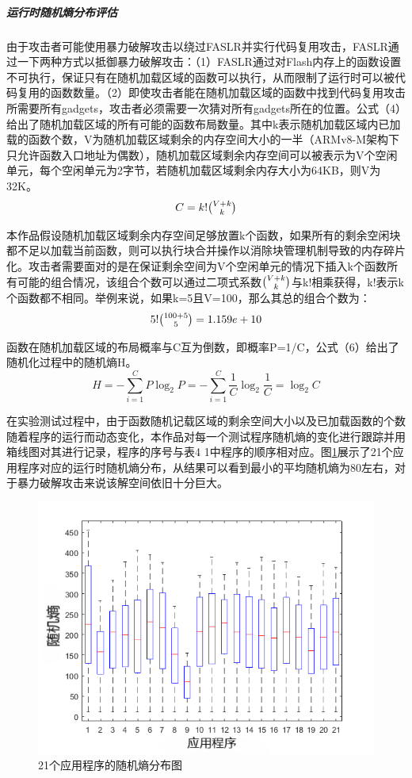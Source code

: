\documentclass[UTF8,12pt,a4paper,twoside]{ctexart}
\numberwithin{figure}{section}
\begin{document}
\subparagraph{运行时随机熵分布评估}
\par 由于攻击者可能使用暴力破解攻击以绕过FASLR并实行代码复用攻击，FASLR通过一下两种方式以抵御暴力破解攻击：（1）FASLR通过对Flash内存上的函数设置不可执行，保证只有在随机加载区域的函数可以执行，从而限制了运行时可以被代码复用的函数数量。（2）即使攻击者能在随机加载区域的函数中找到代码复用攻击所需要所有gadgets，攻击者必须需要一次猜对所有gadgets所在的位置。公式（4）给出了随机加载区域的所有可能的函数布局数量。其中k表示随机加载区域内已加载的函数个数，V为随机加载区域剩余的内存空间大小的一半（ARMv8-M架构下只允许函数入口地址为偶数），随机加载区域剩余内存空间可以被表示为V个空闲单元，每个空闲单元为2字节，若随机加载区域剩余内存大小为64KB，则V为32K。
\begin{equation}
    C = k!\tbinom{V+k}{k}
\end{equation}
\par 本作品假设随机加载区域剩余内存空间足够放置k个函数，如果所有的剩余空闲块都不足以加载当前函数，则可以执行块合并操作以消除块管理机制导致的内存碎片化。攻击者需要面对的是在保证剩余空间为V个空闲单元的情况下插入k个函数所有可能的组合情况，该组合个数可以通过二项式系数$\tbinom{V+k}{k}$与k!相乘获得，k!表示k个函数都不相同。举例来说，如果k=5且V=100，那么其总的组合个数为：
\begin{equation}
    5!\tbinom{100+5}{5}=1.159e+10
\end{equation}
\par 函数在随机加载区域的布局概率与C互为倒数，即概率P=1/C，公式（6）给出了随机化过程中的随机熵H。
\begin{equation}
    H=-\sum_{i=1}^C P\log_2 P = -\sum_{i=1}^{C} \frac{1}{C}\log_2 \frac{1}{C} = \log_2 C
\end{equation}
\par 在实验测试过程中，由于函数随机记载区域的剩余空间大小以及已加载函数的个数随着程序的运行而动态变化，本作品对每一个测试程序随机熵的变化进行跟踪并用箱线图对其进行记录，程序的序号与表4 1中程序的顺序相对应。图\ref{randomEntropy}展示了21个应用程序对应的运行时随机熵分布，从结果可以看到最小的平均随机熵为80左右，对于暴力破解攻击来说该解空间依旧十分巨大。
\begin{figure}[H]
    \label{randomEntropy}
    \centering
    \includegraphics[scale=0.7]{graph/randomEntropy.png}
    \caption{21个应用程序的随机熵分布图}
\end{figure}
\end{document}

